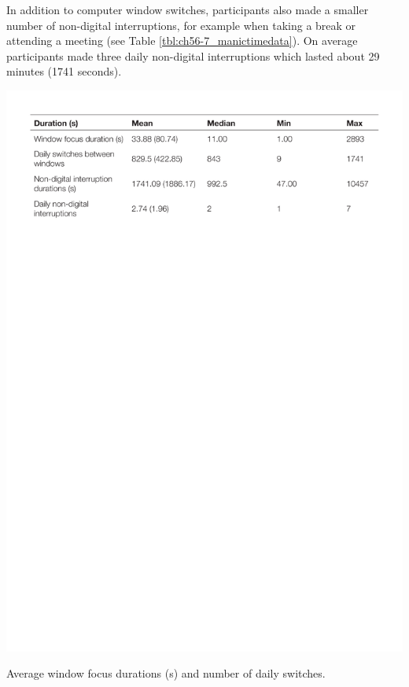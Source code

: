 In addition to computer window switches, participants also made a smaller number of non-digital interruptions, for example when taking a break or attending a meeting (see Table \ref{tbl:ch56-7_manictimedata}). On average participants made three daily non-digital interruptions which lasted about 29 minutes (1741 seconds). 

\begin{table}
\centering
\centerline{\includegraphics[scale=0.7]{images/ch56/ch56_ManicTimeData.pdf}}
\caption{Average window focus durations (s) and number of daily switches.}
\label{tbl:ch56-7_manictimedata}
\end{table}

